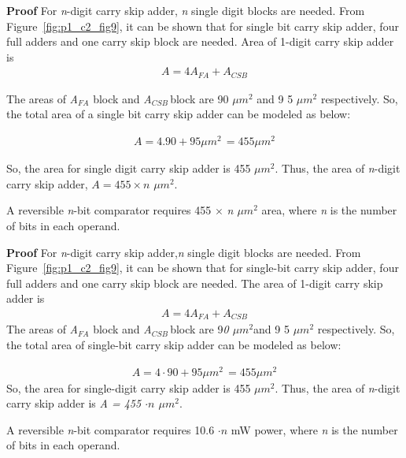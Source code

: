 \noindent \textbf{Proof} For {\it n}-digit carry skip adder, {\it n} single digit blocks are needed. From Figure~\ref{fig:p1_c2_fig9}, it can be shown that for single bit carry skip adder, four full adders and one carry skip block are needed. Area of {1}-digit carry skip adder is
\begin{align*}
A = 4A{}_{FA} + A{}_{CSB}
\end{align*}


The areas of {\it A${}_{FA}$} block and {\it A${}_{CSB\ }$}block are { 90 $\mu m{}^{2}$} and 9{ 5 $\mu m{}^{2}$} respectively. So, the total area of a single bit carry skip adder can be modeled as below:

\begin{align*}
A = 4 . 90 + 95 \mu m{}^{2\ }=455 \mu m{}^{2}
\end{align*}

So, the area for single digit carry skip adder is {455 $\mu m{}^{2}$. }Thus, the area of {\it n}-digit carry skip adder, {$ A = 455 \times n$ $\mu m{}^{2}$}.


\begin{property}\textnormal{
A reversible {\it n}-bit comparator requires 455 ${\times}$ {\it n $\mu m{}^{2}$} area, where {\it n} is the number of bits in each operand.}
\end{property}

\noindent \textbf{Proof}
For {\it n}-digit carry skip adder,{\it n} single digit blocks are needed. From Figure~\ref{fig:p1_c2_fig9}, it can be shown that for single-bit carry skip adder, four full adders and one carry skip block are needed. The area of {1}-digit carry skip adder is
\begin{align*}
A = 4A{}_{FA} + A{}_{CSB}
\end{align*}
\textnormal{The areas of {\it A${}_{FA}$} block and {\it A${}_{CSB\ }$}block are 9{\it 0 $\mu m{}^{2}$}and 9{ 5 $\mu m{}^{2}$} respectively. So, the total area of single-bit carry skip adder can be modeled as below:}

\begin{align*}
A = 4 \cdot 90 + 95 \mu m{}^{2\ }=455 \mu m{}^{2}
\end{align*}\textnormal{
So, the area for single-digit carry skip adder is { 455 $\mu m{}^{2}$. }Thus, the area of {\it n}-digit carry skip adder is {\it A = 455 $\cdot n$ $\mu m{}^{2}$}}.



\begin{property}\textnormal{
A reversible {\it n}-bit comparator requires {10.6 $\cdot n$ mW }power, where {\it n} is the number of bits in each operand.}
\end{property}

